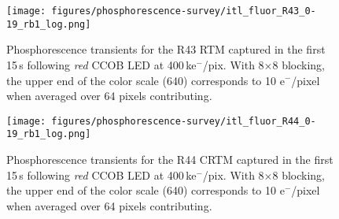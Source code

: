 \begin{figure}[!htbp]
\centering
\texttt{[image: figures/phosphorescence-survey/itl\_fluor\_R43\_0-19\_rb1\_log.png]}
\caption{Phosphorescence transients for the R43 RTM captured in the first 15\,s following {\it red} CCOB LED at 400\,ke$^-$/pix. With 8$\times$8 blocking, the upper end of the color scale (640) corresponds to 10 e$^-$/pixel when averaged over 64 pixels contributing.}
\label{fig:phos:R43}
\end{figure}

\begin{figure}[!htbp]
\centering
\texttt{[image: figures/phosphorescence-survey/itl\_fluor\_R44\_0-19\_rb1\_log.png]}
\caption{Phosphorescence transients for the R44 CRTM captured in the first 15\,s following {\it red} CCOB LED at 400\,ke$^-$/pix. With 8$\times$8 blocking, the upper end of the color scale (640) corresponds to 10 e$^-$/pixel when averaged over 64 pixels contributing.}
\label{fig:phos:R44}
\end{figure}
